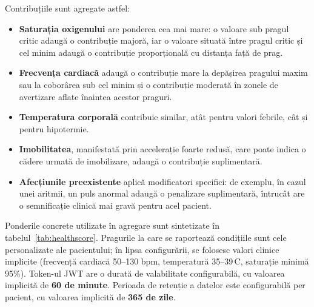\documentclass[12pt,a4paper,twoside]{article}
\begin{document}
Contribuțiile sunt agregate astfel:

\begin{itemize}[leftmargin=1.5em]
\item \textbf{Saturația oxigenului} are ponderea cea mai mare: o valoare sub pragul critic adaugă o contribuție majoră, iar o valoare situată între pragul critic și cel minim adaugă o contribuție proporțională cu distanța față de prag.
\item \textbf{Frecvența cardiacă} adaugă o contribuție mare la depășirea pragului maxim sau la coborârea sub cel minim și o contribuție moderată în zonele de avertizare aflate înaintea acestor praguri.
\item \textbf{Temperatura corporală} contribuie similar, atât pentru valori febrile, cât și pentru hipotermie.
\item \textbf{Imobilitatea}, manifestată prin accelerație foarte redusă, care poate indica o cădere urmată de imobilizare, adaugă o contribuție suplimentară.
\item \textbf{Afecțiunile preexistente} aplică modificatori specifici: de exemplu, în cazul unei aritmii, un puls anormal adaugă o penalizare suplimentară, întrucât are o semnificație clinică mai gravă pentru acel pacient.
\end{itemize}

Ponderile concrete utilizate în agregare sunt sintetizate în tabelul~\ref{tab:healthscore}. Pragurile la care se raportează condițiile sunt cele personalizate ale pacientului; în lipsa configurării, se folosesc valori clinice implicite (frecvență cardiacă 50--130 bpm, temperatură 35--39\,\textdegree C, saturație minimă 95\%). Token-ul JWT are o durată de valabilitate configurabilă, cu valoarea implicită de \textbf{60 de minute}. Perioada de retenție a datelor este configurabilă per pacient, cu valoarea implicită de \textbf{365 de zile}.
\end{document}
